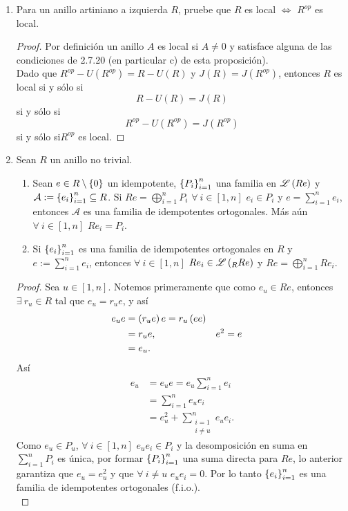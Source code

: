 \documentclass{article}
\begin{document}
\begin{enumerate}[label=\textbf{Ej \arabic*.}]
\item Para un anillo artiniano a izquierda $R$, pruebe que $R$ es local $\iff$ $R^{op}$ es local.
\begin{proof}
Por definición un anillo $A$ es local si $A\neq 0$ y satisface alguna de las condiciones de 2.7.20 (en particular c) de esta proposición). \\
Dado que $R^{op}-U(R^{op})=R-U(R)$ y $J(R)=J(R^{op})$, entonces $R$ es local si y sólo si 
\[R-U(R)=J(R)\]
si y sólo si
\[R^{op}-U(R^{op})=J(R^{op})\]
si y sólo si\quad  $R^{op}$ es local.
\end{proof}

		\item Sean $R$ un anillo no trivial.
		\begin{enumerate}
			\item Sean $e\in R\setminus\left\{0\right\}$ un idempotente, ${\left\{{P}_{i}\right\}}_{i=1}^{n}$ una familia en $\mathscr{L}\left(Re\right)$ y $\mathcal{A}:={\left\{{e}_{i}\right\}}_{i=1}^{n}\subseteq R$. Si $Re=\bigoplus\limits_{i=1}^n P_i$ $\forall\ i\in[1,n]$ $e_i\in P_i$ y $e=\sum\limits_{i=1}^ne_i$, entonces $\mathcal{A}$ es una familia de idempotentes ortogonales. Más aún $\forall\ i\in[1,n]$ $Re_i=P_i$.
			\item Si ${\left\{{e}_{i}\right\}}_{i=1}^{n}$ es una familia de idempotentes ortogonales en $R$ y $e:=\sum\limits_{i=1}^ne_i$, entonces $\forall\ i\in[1,n]$ $Re_i\in\genlin{\ringmod{R}{Re}{l}}$ y $Re=\bigoplus\limits_{i=1}^n Re_i$.
		\end{enumerate}
		\begin{proof}
			 Sea $u\in[1,n]$. Notemos primeramente que como $e_u\in Re$, entonces $\exists\ r_u\in R$ tal que $e_u=r_ue$, y así
			\begin{align*}
				e_ue&=\left(r_ue\right)e=r_u\left(ee\right)\\
				&=r_ue, && e^2=e\\
				&=e_u.
			\end{align*}
			Así
			\begin{align*}
				e_u&=e_ue=e_u\sum\limits_{i=1}^ne_i\\
				&=\sum\limits_{i=1}^n e_ue_i\\
				&=e_u^2+\sum\limits_{\substack{i=1\\i\neq u}}^n e_ue_i.
			\end{align*}			
			Como $e_u\in P_u$, $\forall\ i\in [1,n]$ $e_ue_i\in P_i$ y la desomposición en suma en $\sum\limits_{i=1}^nP_i$ es única, por formar ${\left\{{P}_{i}\right\}}_{i=1}^{n}$ una suma directa para $Re$, lo anterior garantiza que
			$e_u=e_u^2$ y que $\forall\ i\neq u$ $e_ue_i=0$. Por lo tanto ${\left\{{e}_{i}\right\}}_{i=1}^{n}$ es una familia de idempotentes ortogonales (f.i.o.). \\

\end{proof}
\end{enumerate}
\end{document}
